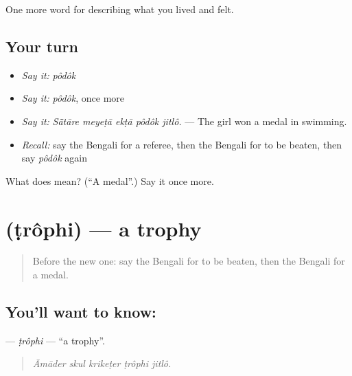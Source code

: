 \begin{grammarlens}[title={What you've built}]
One more word for describing what you lived and felt.
\end{grammarlens}

\subsection*{Your turn}
\begin{itemize}
\raggedright
  \item \emph{Say it:} \emph{pôdôk}
  \item \emph{Say it:} \emph{pôdôk}, once more
  \item \emph{Say it:} \emph{Sā̃tāre meyeṭā ekṭā pôdôk jitlô.} — The girl won a medal in swimming.
  \item \emph{Recall:} say the Bengali for a referee, then the Bengali for to be beaten, then say \emph{pôdôk} again
\end{itemize}

\begin{tcolorbox}[breakable,colback=teal!4,colframe=teal!35!black,title={Before you move on}]
What does  mean? (\textquotedblleft{}A medal\textquotedblright{}.) Say it once more.
\end{tcolorbox}
\section[\texorpdfstring{\bn{ট্রফি} (ṭrôphi)}{ট্রফি (ṭrôphi)}]{ (ṭrôphi) — a trophy}

\label{lesson:BN-C520-trophi}



\begin{quote}
Before the new one: say the Bengali for to be beaten, then the Bengali for a medal.
\end{quote}

\subsection*{You'll want to know: }
\textbf{} — \emph{ṭrôphi} — \textquotedblleft{}a trophy\textquotedblright{}.

\begin{quote}
    
\end{quote}

\begin{quote}
\emph{Āmāder skul krikeṭer ṭrôphi jitlô.}
\end{quote}

